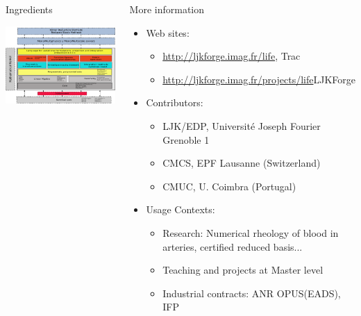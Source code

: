 \documentclass[final,utf8,,hyperref={pdfpagelabels=false}]{beamer}
\begin{document}
\begin{frame}[containsverbatim]{}
\begin{columns}[t]
    \begin{block}{Ingredients}
      \centerline{\includegraphics[width=\linewidth]{arch2.pdf}}
    \end{block}
    \vfill
    \begin{block}{More information}
      \begin{itemize}
      \item Web sites:
        \begin{itemize}
        \item \url{http://ljkforge.imag.fr/life}, \hfill{Trac}
        \item \url{http://ljkforge.imag.fr/projects/life}\hfill{LJKForge}
        \end{itemize}
      \item Contributors:
        \begin{itemize}
        \item LJK/EDP, Université Joseph Fourier Grenoble 1
        \item CMCS, EPF Lausanne (Switzerland)
        \item CMUC, U. Coimbra (Portugal)
        \end{itemize}
      \item Usage Contexts:
        \begin{itemize}
        \item Research: Numerical rheology of blood in arteries, certified
          reduced basis...
        \item Teaching and projects at Master level
        \item Industrial contracts: ANR OPUS(EADS), IFP
        \end{itemize}
      \end{itemize}
    \end{block}
  

\end{columns}
\end{frame}
\end{document}
